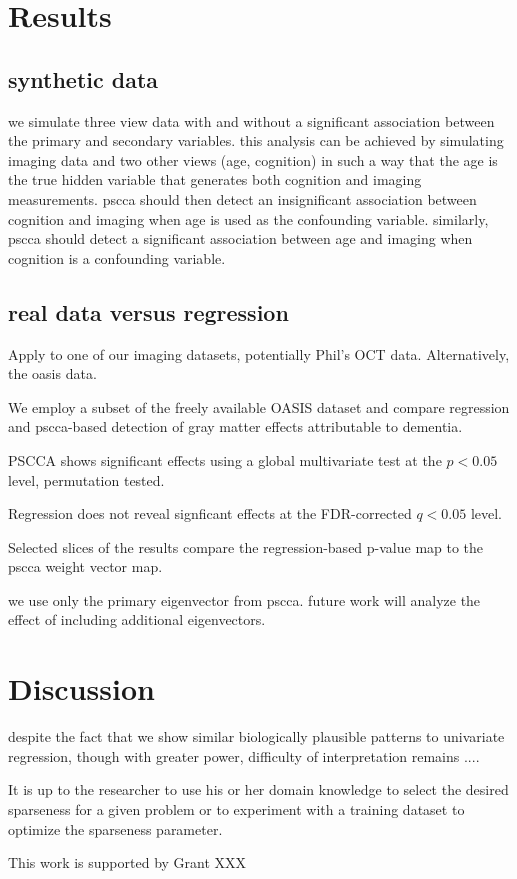\documentclass{llncs}
\begin{document}
\section{Results}
\subsection{synthetic data}
we simulate three view data with and without a significant association
between the primary and secondary variables.  this analysis can be
achieved by simulating imaging data and two other views (age,
cognition) in such a way that the age is the true hidden variable that
generates both cognition and imaging measurements.  pscca should then
detect an insignificant association between cognition and imaging when
age is used as the confounding variable.  similarly, pscca should
detect a significant association between age and imaging when
cognition is a confounding variable.   

\subsection{real data versus regression}
Apply to one of our imaging datasets, potentially Phil's OCT data.
Alternatively, the oasis data. 

We employ a subset of the freely available OASIS dataset and compare
regression and pscca-based detection of gray matter effects
attributable to dementia.

PSCCA shows significant effects using a global multivariate test at
the $p<0.05$ level, permutation tested.  

Regression does not reveal signficant effects at the FDR-corrected
$q<0.05$ level.  

Selected slices of the results compare the regression-based p-value
map to the pscca weight vector map.  

we use only the primary eigenvector from pscca.  future work will
analyze the effect of including additional eigenvectors. 

\section{Discussion}

despite the fact that we show similar biologically plausible patterns to univariate
regression, though with greater power, 
difficulty of interpretation remains ....  

It is up to
the researcher to use his or her domain knowledge to select the
desired sparseness for a given problem or to experiment with a
training dataset to optimize the sparseness parameter.

 This work is supported by Grant XXX 


\end{document}

